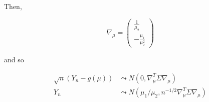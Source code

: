 Then,

\[ \nabla_\mu 
= \begin{pmatrix} \frac{1}{\mu_{2}} \\ -\frac{\mu_{1}}{\mu_{2}^{2}} \end{pmatrix} 
\]

and so

\begin{align*}
\sqrt{n}(Y_{n} - g(\mu)) & \leadsto N(0, \nabla_\mu^T \Sigma \nabla_\mu)  \\
Y_{n} & \leadsto N(\mu_{1} / \mu_{2}, n^{-1/2} \nabla_\mu^T \Sigma \nabla_\mu) 
\end{align*}


